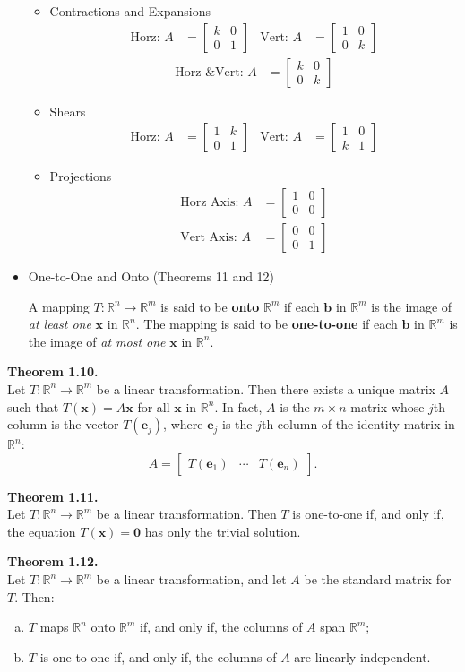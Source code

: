 \documentclass[10pt]{book}
\newenvironment{boxthm}{\begin{mdframed}[backgroundcolor=gray!30,nobreak=true]}{\end{mdframed}}
\newenvironment{boxdef}{\begin{mdframed}[backgroundcolor=gray!30,linewidth=0pt,nobreak=true]}{\end{mdframed}}
\newcommand{\R}{\mathbb{R}}
\newcommand{\vect}[1]{\ensuremath{\boldsymbol{\mathbf{#1}}}}
\newcommand{\Ax}{A\vect{x}}
\newcommand{\Tx}{T(\vect{x})}
\newcommand{\ve}[1]{\vect{e}_{#1}}
\newcommand{\Te}[1]{T(\ve{#1})}
\newcommand{\Tmap}[2]{T:\R^{#1}\to\R^{#2}}
\newcommand{\ShearMatHorz}[1][k]{\begin{bmatrix}1&#1\\0&1\end{bmatrix}}
\newcommand{\ShearMatVert}[1][k]{\begin{bmatrix}1&0\\#1&1\end{bmatrix}}
\newcommand{\ExpandMatHorz}[1][k]{\begin{bmatrix}#1&0\\0&1\end{bmatrix}}
\newcommand{\ExpandMatVert}[1][k]{\begin{bmatrix}1&0\\0&#1\end{bmatrix}}
\newcommand{\ExpandMatBoth}[1][k]{\begin{bmatrix}#1&0\\0&#1\end{bmatrix}}
\newcommand{\ProjMatHorz}{\begin{bmatrix}1&0\\0&0\end{bmatrix}}
\newcommand{\ProjMatVert}{\begin{bmatrix}0&0\\0&1\end{bmatrix}}
\begin{document}
\begin{itemize}
\begin{multicols}{2}
\begin{itemize}
			\item Contractions and Expansions
				\begin{align*}
				\text{Horz: } A&=\ExpandMatHorz &
				\text{Vert: } A&=\ExpandMatVert
				\end{align*}
				\begin{align*}
				\text{Horz \& Vert: } A&=\ExpandMatBoth
				\end{align*}
			\item Shears
				\begin{align*}
				\text{Horz: } A&=\ShearMatHorz &
				\text{Vert: } A&=\ShearMatVert
				\end{align*}
			\item Projections
				\begin{align*}
				\text{Horz Axis: } A&=\ProjMatHorz \\
				\text{Vert Axis: } A&=\ProjMatVert
				\end{align*}
		\end{itemize}
		\end{multicols}
	\item One-to-One and Onto (Theorems 11 and 12)
		\begin{boxdef}
			A mapping $\Tmap{n}{m}$ is said to be \textbf{onto} $\R^m$ if each $\vect{b}$ in $\R^m$ is the image of \emph{at least one} $\vect{x}$ in $\R^n$. The mapping is said to be \textbf{one-to-one} if each $\vect{b}$ in $\R^m$ is the image of \emph{at most one} $\vect{x}$ in $\R^n$.
		\end{boxdef}
\end{itemize}

\begin{boxthm}
	\textbf{Theorem 1.10.} \\
	Let $T:\R^n\to\R^m$ be a linear transformation. Then there exists a unique matrix $A$ such that $\Tx=\Ax$ for all $\vect{x}$ in $\R^n$. In fact, $A$ is the $m\times n$ matrix whose $j$th column is the vector $\Te{j}$, where $\ve{j}$ is the $j$th column of the identity matrix in $\R^n$:
	$$ A = \begin{bmatrix}\Te1 & \cdots & \Te{n}\end{bmatrix}. $$
\end{boxthm}
\begin{boxthm}
	\textbf{Theorem 1.11.} \\
	Let $T:\R^n\to\R^m$ be a linear transformation. Then $T$ is one-to-one if, and only if, the equation $\Tx=\vect{0}$ has only the trivial solution.
\end{boxthm}
\begin{boxthm}
	\textbf{Theorem 1.12.} \\
	Let $T:\R^n\to\R^m$ be a linear transformation, and let $A$ be the standard matrix for $T$. Then:
	\begin{enumerate}[(a)]
		\item $T$ maps $\R^n$ onto $\R^m$ if, and only if, the columns of $A$ span $\R^m$;
		\item $T$ is one-to-one if, and only if, the columns of $A$ are linearly independent.
	\end{enumerate}
\end{boxthm}
\end{document}
